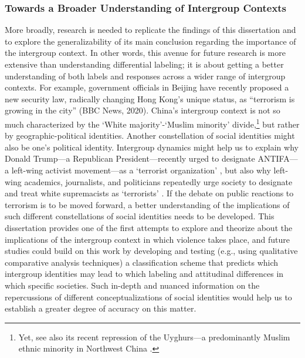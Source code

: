 \subsubsection{Towards a Broader Understanding of Intergroup Contexts}
More broadly, research is needed to replicate the findings of this dissertation and to explore the generalizability of its main conclusion regarding the importance of the intergroup context. In other words, this avenue for future research is more extensive than understanding differential labeling; it is about getting a better understanding of both labels and responses across a wider range of intergroup contexts. For example, government officials in Beijing have recently proposed a new security law, radically changing Hong Kong's unique status, as ``terrorism is growing in the city'' (BBC News, 2020). China's intergroup context is not so much characterized by the `White majority'-`Muslim minority' divide,\footnote{Yet, see also its recent repression of the Uyghurs---a predominantly Muslim ethnic minority in Northwest China \citep{Chestnut2020}.} but rather by geographic-political identities. Another constellation of social identities might also be one's political identity. Intergroup dynamics might help us to explain why Donald Trump---a Republican President---recently urged to designate ANTIFA---a left-wing activist movement---as a `terrorist organization' \citep{Trump2020}, but also why left-wing academics, journalists, and politicians repeatedly urge society to designate and treat white supremacists as `terrorists' \citep{Meier2020b}. If the debate on public reactions to terrorism is to be moved forward, a better understanding of the implications of such different constellations of social identities needs to be developed. This dissertation provides one of the first attempts to explore and theorize about the implications of the intergroup context in which violence takes place, and future studies could build on this work by developing and testing (e.g., using qualitative comparative analysis techniques) a classification scheme that predicts which intergroup identities may lead to which labeling and attitudinal differences in which specific societies. Such in-depth and nuanced information on the repercussions of different conceptualizations of social identities would help us to establish a greater degree of accuracy on this matter.


